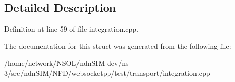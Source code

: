 \subsection{Detailed Description}


Definition at line 59 of file integration.\+cpp.



The documentation for this struct was generated from the following file\+:\begin{DoxyCompactItemize}
\item 
/home/network/\+N\+S\+O\+L/ndn\+S\+I\+M-\/dev/ns-\/3/src/ndn\+S\+I\+M/\+N\+F\+D/websocketpp/test/transport/integration.\+cpp\end{DoxyCompactItemize}
